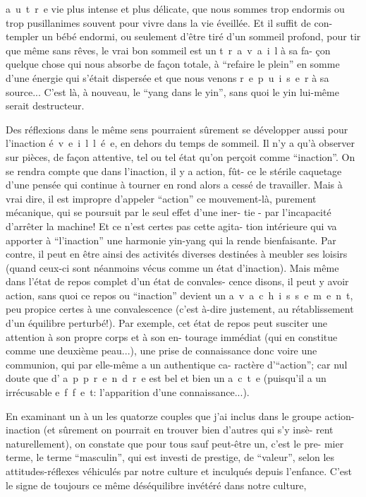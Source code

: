\mbox{a u t r e} vie plus intense et plus délicate, que nous sommes trop endormis ou
trop pusillanimes souvent pour vivre dans la vie éveillée. Et il suffit de con-
templer un bébé endormi, ou seulement d'être tiré d'un sommeil profond, pour 
tir que même sans rêves, le vrai bon sommeil est un \mbox{t r a v a i l} à sa fa-
çon\inserted{\unsure{:}} quelque chose qui nous absorbe de façon totale, à ``refaire le plein'' en
somme d'une énergie qui s'était dispersée et que nous venons \mbox{r e p u i s e r}
à sa source... C'est là, à nouveau, le ``yang dans le yin'', sans quoi le yin
lui-même serait destructeur.

Des réflexions dans le même sens pourraient sûrement se développer aussi
pour l'inaction \mbox{é v e i l l é e}, en dehors du temps de sommeil. Il n'y a
qu'à observer sur pièces, de façon attentive, tel ou tel état qu'on perçoit
comme ``inaction''. On se rendra compte que dans l'inaction, il y a action, fût-
ce le stérile caquetage d'une pensée qui continue à tourner en rond alors 
a cessé de travailler. Mais à vrai dire, il est impropre d'appeler ``action'' ce
mouvement-là, purement mécanique, qui se poursuit par le seul effet d'une iner-
tie - par l'incapacité d'arrêter la machine! Et ce n'est certes pas cette agita-
tion intérieure qui va apporter à ``l'inaction'' une harmonie yin-yang qui la
rende bienfaisante. Par contre, il peut en être ainsi des activités diverses
destinées à meubler ses loisirs (quand ceux-ci sont néanmoins vécus comme un
état d'inaction). Mais même dans l'état de repos complet d'un état de convales-
cence disons, il peut y avoir action, sans quoi ce repos ou ``inaction'' devient
un \mbox{a v a c h i s s e m e n t}, peu propice certes à une convalescence (c'est
à-dire justement, au rétablissement d'un équilibre perturbé!). Par exemple,
cet état de repos peut susciter une attention à son propre corps et à son en-
tourage immédiat (qui en constitue comme une deuxième peau...), une prise de
connaissance donc voire une communion, qui par elle-même a un authentique ca-
ractère d'``action''; car nul doute que d' \mbox{a p p r e n d r e} est bel et bien
un \mbox{a c t e} (puisqu'il a un irrécusable \mbox{e f f e t}: l'apparition d'une
connaissance...).

En examinant un à un les quatorze couples que j'ai inclus dans le groupe
action-inaction (et sûrement on pourrait en trouver bien d'autres qui s'y insè-
rent naturellement), on constate que pour tous sauf peut-être un, c'est le pre-
mier terme, le terme ``masculin'', qui est investi de prestige, de ``valeur'', selon
les attitudes-réflexes véhiculés par notre culture et inculqués depuis l'enfance.
C'est le signe de toujours ce même déséquilibre invétéré dans notre culture,

